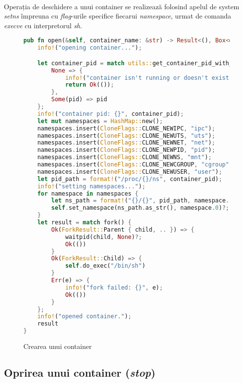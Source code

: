             \paragraph{} Operația de deschidere a unui container se realizează folosind apelul de system \textit{setns} împreuna cu \textit{flag}-urile specifice fiecarui \textit{namespace}, urmat de comanda \textit{execve} cu interpretorul \textit{sh}.
            \begin{figure}[h!]
                \begin{lstlisting}[language=Rust, style=boxed, caption={Crearea unui container},captionpos=b]
pub fn open(&self, container_name: &str) -> Result<(), Box<dyn std::error::Error>> {
    info!("opening container...");

    let container_pid = match utils::get_container_pid_with_str(container_name).unwrap() {
        None => {
            info!("container isn't running or doesn't exist. exiting...");
            return Ok(());
        },
        Some(pid) => pid
    };
    info!("container pid: {}", container_pid);
    let mut namespaces = HashMap::new();
    namespaces.insert(CloneFlags::CLONE_NEWIPC, "ipc");
    namespaces.insert(CloneFlags::CLONE_NEWUTS, "uts");
    namespaces.insert(CloneFlags::CLONE_NEWNET, "net");
    namespaces.insert(CloneFlags::CLONE_NEWPID, "pid");
    namespaces.insert(CloneFlags::CLONE_NEWNS, "mnt");
    namespaces.insert(CloneFlags::CLONE_NEWCGROUP, "cgroup");
    namespaces.insert(CloneFlags::CLONE_NEWUSER, "user");
    let pid_path = format!("/proc/{}/ns", container_pid);
    info!("setting namespaces...");
    for namespace in namespaces {
        let ns_path = format!("{}/{}", pid_path, namespace.1);
        self.set_namespace(ns_path.as_str(), namespace.0)?;
    }
    let result = match fork() {
        Ok(ForkResult::Parent { child, .. }) => {
            waitpid(child, None)?;
            Ok(())
        }
        Ok(ForkResult::Child) => {
            self.do_exec("/bin/sh")
        }
        Err(e) => {
            info!("fork failed: {}", e);
            Ok(())
        }
    };
    info!("opened container.");
    result
}                \end{lstlisting}
                \caption{Crearea unui container}
                \label{fig:cod_ccreate}
            \end{figure}

        \subsection{Oprirea unui container (\textit{stop})}
